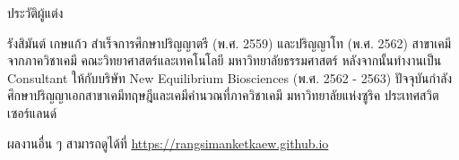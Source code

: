 

{
\thispagestyle{empty}

\begin{center}
    ประวัติผู้แต่ง
\end{center}

รังสิมันต์ เกษแก้ว สำเร็จการศึกษาปริญญาตรี (พ.ศ. 2559) และปริญญาโท (พ.ศ. 2562) สาขาเคมี จากภาควิชาเคมี 
คณะวิทยาศาสตร์และเทคโนโลยี มหาวิทยาลัยธรรมศาสตร์ หลังจากนั้นทำงานเป็น Consultant ให้กับบริษัท New Equilibrium Biosciences 
(พ.ศ. 2562 - 2563) ปัจจุบันกำลังศึกษาปริญญาเอกสาขาเคมีทฤษฎีและเคมีคำนวณที่ภาควิชาเคมี มหาวิทยาลัยแห่งซูริค ประเทศสวิตเซอร์แลนด์

\noindent ผลงานอื่น ๆ สามารถดูได้ที่ \url{https://rangsimanketkaew.github.io}

\vfill
}

